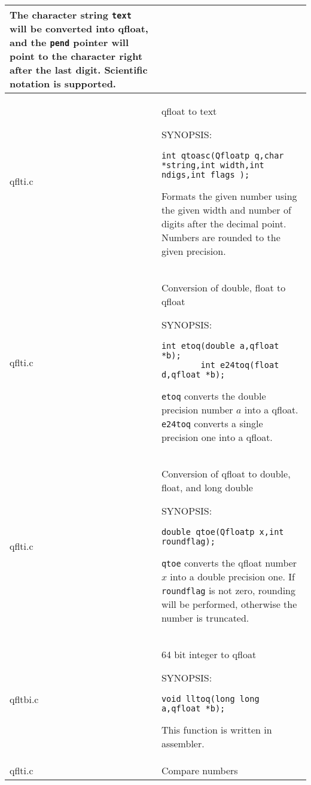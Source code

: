 \documentclass[10pt,a4paper,x11names]{memoir} %
\newcommand{\TOC}[1] {\addcontentsline{toc}{section}{#1} #1 \par}
\begin{document}
\begin{longtable}{|p{1.5cm}|p{11.5cm}|}
	The character string \verb,text, will be converted into qfloat, and the \verb,pend, pointer will point to the character right after the last digit. Scientific notation is supported.
	\\\hline
	qflti.c& \TOC{qfloat to text}\index{qtoasc}
	
	{\footnotesize SYNOPSIS:}\vspace{-0.2cm}
	\begin{lstlisting}[numbers=none]
		int qtoasc(Qfloatp q,char *string,int width,int ndigs,int flags );
	\end{lstlisting}\vspace{-0.2cm} \par
	
	Formats the given number using the given width and number of digits after the decimal point. Numbers are rounded to the given
	precision.
	\\\hline
	qflti.c&\TOC{Conversion of double, float to qfloat}
	
	{\footnotesize SYNOPSIS:}\vspace{-0.2cm}\index{etoq}\index{e24toq}
	\begin{lstlisting}[numbers=none]
		int etoq(double a,qfloat *b);
		int e24toq(float d,qfloat *b);
	\end{lstlisting}\vspace{-0.2cm} \par
	\verb,etoq, converts the double precision number $a$ into a qfloat. \verb,e24toq, converts a single
	precision one into a qfloat.
	\\\hline
	qflti.c& \TOC{Conversion of qfloat to double, float, and long double}
	
	{\footnotesize SYNOPSIS:}\vspace{-0.2cm}\index{qtoe}
	\begin{lstlisting}[numbers=none]
		double qtoe(Qfloatp x,int roundflag);
	\end{lstlisting}\vspace{-0.2cm} \par
	
	\verb,qtoe, converts the qfloat number $x$ into a double precision one. If \verb,roundflag, is not zero, rounding will be performed,
	otherwise the number is truncated.
	\\\hline
	qfltbi.c&\TOC{64 bit integer to qfloat}
	
	{\footnotesize SYNOPSIS:}\vspace{-0.2cm}\index{lltoq}
	\begin{lstlisting}[numbers=none]
		void lltoq(long long a,qfloat *b);
	\end{lstlisting}\vspace{-0.2cm} \par
	This function is written in assembler.
	\\\hline
	qflti.c& \TOC{Compare numbers}
	

\end{longtable}
\end{document}
